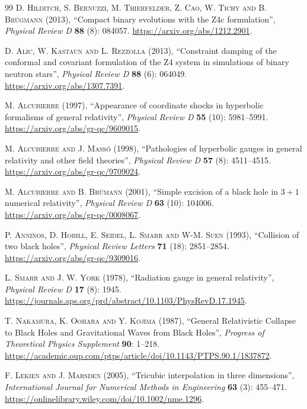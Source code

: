 \documentclass{article}
\begin{document}
\begin{thebibliography}{99}
\textsc{D. Hilditch, S. Bernuzzi, M. Thierfelder, Z. Cao, W. Tichy and B. Br\"ugmann} (2013), ``Compact binary evolutions with the Z4c formulation'', \textit{Physical Review D} \textbf{88} (8): 084057. \url{https://arxiv.org/abs/1212.2901}.

\textsc{D. Alic, W. Kastaun and L. Rezzolla} (2013), ``Constraint damping of the conformal and covariant formulation of the Z4 system in simulations of binary neutron stars'', \textit{Physical Review D} \textbf{88} (6): 064049. \url{https://arxiv.org/abs/1307.7391}.

\textsc{M. Alcubierre} (1997), ``Appearance of coordinate shocks in hyperbolic formalisms of general relativity'', \textit{Physical Review D} \textbf{55} (10): 5981--5991. \url{https://arxiv.org/abs/gr-qc/9609015}.

\textsc{M. Alcubierre and J. Mass\'o} (1998), ``Pathologies of hyperbolic gauges in general relativity and other field theories'', \textit{Physical Review D} \textbf{57} (8): 4511--4515. \url{https://arxiv.org/abs/gr-qc/9709024}.

\textsc{M. Alcubierre and B. Br\"umann} (2001), ``Simple excision of a black hole in ${3 + 1}$ numerical relativity'', \textit{Physical Review D} \textbf{63} (10): 104006. \url{https://arxiv.org/abs/gr-qc/0008067}.

\textsc{P. Anninos, D. Hobill, E. Seidel, L. Smarr and W-M. Suen} (1993), ``Collision of two black holes'', \textit{Physical Review Letters} \textbf{71} (18): 2851--2854. \url{https://arxiv.org/abs/gr-qc/9309016}.

\textsc{L. Smarr and J. W. York} (1978), ``Radiation gauge in general relativity'', \textit{Physical Review D} \textbf{17} (8): 1945. \url{https://journals.aps.org/prd/abstract/10.1103/PhysRevD.17.1945}.

\textsc{T. Nakamura, K. Oohara and Y. Kojima} (1987), ``General Relativistic Collapse to Black Holes and Gravitational Waves from Black Holes'', \textit{Progress of Theoretical Physics Supplement} \textbf{90}: 1--218. \url{https://academic.oup.com/ptps/article/doi/10.1143/PTPS.90.1/1837872}.

\textsc{F. Lekien and J. Marsden} (2005), ``Tricubic interpolation in three dimensions'', \textit{International Journal for Numerical Methods in Engineering} \textbf{63} (3): 455--471. \url{https://onlinelibrary.wiley.com/doi/10.1002/nme.1296}.


\end{thebibliography}
\end{document}

